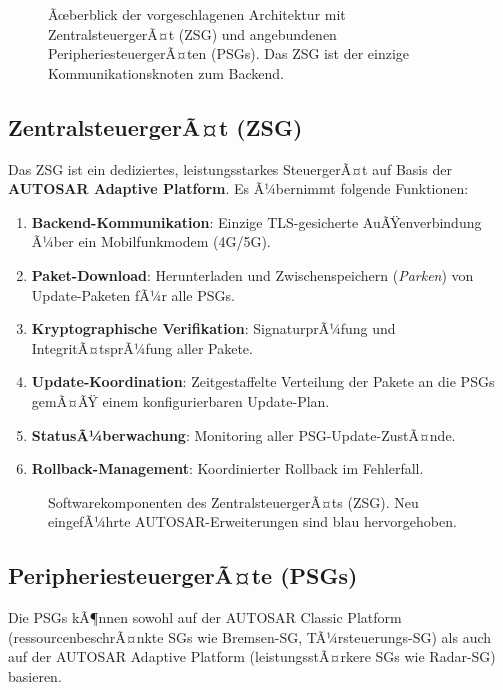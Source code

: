 ﻿\documentclass[12pt,a4paper,twoside]{article}
\begin{document}
\begin{figure}[h!]
  \centering
  
  \caption{Ãœberblick der vorgeschlagenen Architektur mit ZentralsteuergerÃ¤t
    (ZSG) und angebundenen PeripheriesteuergerÃ¤ten (PSGs).
    Das ZSG ist der einzige Kommunikationsknoten zum Backend.}
  \label{fig:architecture_overview}
\end{figure}

\subsection{ZentralsteuergerÃ¤t (ZSG)}
\label{subsec:zsg}

Das ZSG ist ein dediziertes, leistungsstarkes SteuergerÃ¤t auf Basis der
\textbf{AUTOSAR Adaptive Platform}. Es Ã¼bernimmt folgende Funktionen:

\begin{enumerate}
  \item \textbf{Backend-Kommunikation}: Einzige TLS-gesicherte
    AuÃŸenverbindung Ã¼ber ein Mobilfunkmodem (4G/5G).
  \item \textbf{Paket-Download}: Herunterladen und Zwischenspeichern
    (\textit{Parken}) von Update-Paketen fÃ¼r alle PSGs.
  \item \textbf{Kryptographische Verifikation}: SignaturprÃ¼fung und
    IntegritÃ¤tsprÃ¼fung aller Pakete.
  \item \textbf{Update-Koordination}: Zeitgestaffelte Verteilung der
    Pakete an die PSGs gemÃ¤ÃŸ einem konfigurierbaren Update-Plan.
  \item \textbf{StatusÃ¼berwachung}: Monitoring aller PSG-Update-ZustÃ¤nde.
  \item \textbf{Rollback-Management}: Koordinierter Rollback im Fehlerfall.
\end{enumerate}

\begin{figure}[h!]
  \centering
  
  \caption{Softwarekomponenten des ZentralsteuergerÃ¤ts (ZSG).
    Neu eingefÃ¼hrte AUTOSAR-Erweiterungen sind blau hervorgehoben.}
  \label{fig:zsg_components}
\end{figure}

\subsection{PeripheriesteuergerÃ¤te (PSGs)}
\label{subsec:psgs}

Die PSGs kÃ¶nnen sowohl auf der AUTOSAR Classic Platform (ressourcenbeschrÃ¤nkte
SGs wie Bremsen-SG, TÃ¼rsteuerungs-SG) als auch auf der AUTOSAR Adaptive
Platform (leistungsstÃ¤rkere SGs wie Radar-SG) basieren.
\end{document}
